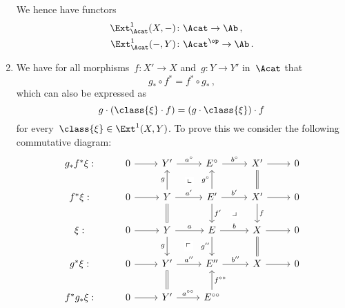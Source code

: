 \begin{remark}
\begin{enumerate}
      We hence have functors
      \begin{align*}
        \Ext^1_\Acat(X,-)
        &\colon
        \Acat
        \to
        \Ab \,,
      \\
        \Ext^1_\Acat(-,Y)
        &\colon
        \Acat^\op
        \to
        \Ab \,.
      \end{align*}
    \item
      We have for all morphisms~$f \colon X' \to X$ and~$g \colon Y \to Y'$ in~$\Acat$ that
      \[
        g_* \circ f^*
        =
        f^* \circ g_* \,,
      \]
      which can also be expressed as
      \[
        g \cdot (\class{\xi} \cdot f)
        =
        (g \cdot \class{\xi}) \cdot f
      \]
      for every~$\class{\xi} \in \Ext^1(X,Y)$.
      To prove this we consider the following commutative diagram:
      \[
        \begin{tikzcd}
            g_* f^* \xi:
          & 0
            \arrow{r}
          & Y'
            \arrow{r}[above]{a^\circ}
          & E^\circ
            \arrow{r}[above]{b^\circ}
          & X'
            \arrow{r}
          & 0
          \\
            f^* \xi:
          & 0
            \arrow{r}
          & Y
            \arrow{u}[left]{g}
            \arrow[phantom]{ur}[description]{\llcorner}
            \arrow{r}[above]{a'}
            \arrow[equal]{d}
          & E'
            \arrow{u}[left]{g^\circ}
            \arrow{r}[above]{b'}
            \arrow[phantom]{dr}[description]{\lrcorner}
            \arrow{d}[right]{f'}
          & X'
            \arrow[equal]{u}
            \arrow{r}
            \arrow{d}[right]{f}
          & 0
          \\
            \xi:
          & 0
            \arrow{r}
          & Y
            \arrow{r}[above]{a}
            \arrow[phantom]{dr}[description]{\ulcorner}
            \arrow{d}[left]{g}
          & E
            \arrow{r}[above]{b}
            \arrow{d}[left]{g''}
          & X
            \arrow{r}
            \arrow[equal]{d}
          & 0
          \\
            g^* \xi:
          & 0
            \arrow{r}
          & Y'
            \arrow{r}[above]{a''}
          & E''
            \arrow{r}[above]{b''}
          & X
            \arrow{r}
          & 0
          \\
            f^* g_* \xi:
          & 0
            \arrow{r}
          & Y'
            \arrow[equal]{u}
            \arrow{r}[above]{a^{\circ\circ}}
          & E^{\circ\circ}
            \arrow{u}[right]{f^{\circ\circ}}

\end{tikzcd}\]
\end{enumerate}
\end{remark}
